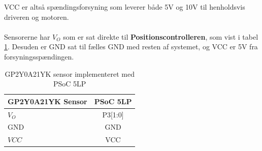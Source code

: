 \noindent
VCC er altså spændingsforsyning som leverer både 5V og 10V til henholdsvis driveren og motoren.
\\
\\
Sensorerne har $V_O$ som er sat direkte til \textbf{Positionscontrolleren}, som vist i tabel \ref{tab:Sensor_pin_konfigurering}. Desuden er GND sat til fælles GND med resten af systemet, og VCC er 5V fra forsyningsspændingen.

\begin{table}[H]
  \centering
\begin{tabular}{ |l|c| }
  \hline
  \textbf{GP2Y0A21YK Sensor} & \textbf{PSoC 5LP}\\
  \hline 
  $V_O$ & P3[1:0] \\
  \hline 
  GND & GND \\
  \hline 
  $VCC$ & VCC \\
  \hline 
\end{tabular}
\caption{GP2Y0A21YK sensor implementeret med PSoC 5LP}\label{tab:Sensor_pin_konfigurering}
\end{table}